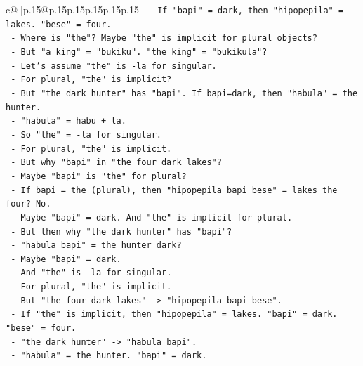 \documentclass{article}
\begin{document}
{\begin{supertabular}{c@{$\;$}|p{.15\linewidth}@{}p{.15\linewidth}p{.15\linewidth}p{.15\linewidth}p{.15\linewidth}p{.15\linewidth}}
{{{\texttt{                  {-} If "bapi" = dark, then "hipopepila" = lakes. "bese" = four.} \\
\texttt{                  {-} Where is "the"? Maybe "the" is implicit for plural objects?} \\
\texttt{                  {-} But "a king" = "bukiku". "the king" = "bukikula"?} \\
\texttt{                  {-} Let's assume "the" is {-}la for singular.} \\
\texttt{                  {-} For plural, "the" is implicit?} \\
\texttt{                  {-} But "the dark hunter" has "bapi". If bapi=dark, then "habula" = the hunter.} \\
\texttt{                  {-} "habula" = habu + la.} \\
\texttt{                  {-} So "the" = {-}la for singular.} \\
\texttt{                  {-} For plural, "the" is implicit.} \\
\texttt{                  {-} But why "bapi" in "the four dark lakes"?} \\
\texttt{                  {-} Maybe "bapi" is "the" for plural?} \\
\texttt{                  {-} If bapi = the (plural), then "hipopepila bapi bese" = lakes the four? No.} \\
\texttt{                  {-} Maybe "bapi" = dark. And "the" is implicit for plural.} \\
\texttt{                  {-} But then why "the dark hunter" has "bapi"?} \\
\texttt{                  {-} "habula bapi" = the hunter dark?} \\
\texttt{                  {-} Maybe "bapi" = dark.} \\
\texttt{                  {-} And "the" is {-}la for singular.} \\
\texttt{                  {-} For plural, "the" is implicit.} \\
\texttt{                  {-} But "the four dark lakes" {-}> "hipopepila bapi bese".} \\
\texttt{                  {-} If "the" is implicit, then "hipopepila" = lakes. "bapi" = dark. "bese" = four.} \\
\texttt{                  {-} "the dark hunter" {-}> "habula bapi".} \\
\texttt{                  {-} "habula" = the hunter. "bapi" = dark.} \\
}}}
\end{supertabular}}
\end{document}
